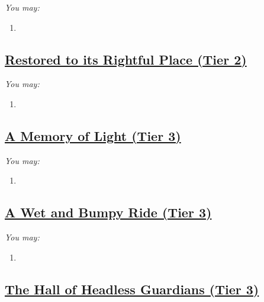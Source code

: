 \documentclass[sheet]{GL2020}
\begin{document}
\begingroup
\itshape
You may:
\begin{enumerate}[A]
  \item 
\end{enumerate}
\endgroup

\clearpage

\begin{center}\section*{\underline{Restored to its Rightful Place (Tier 2)}}\end{center}
\label{RestoredRightfulPlace}

\begingroup
\itshape
You may:
\begin{enumerate}[A]
  \item 
\end{enumerate}
\endgroup

\clearpage

\begin{center}\section*{\underline{A Memory of Light (Tier 3)}}\end{center}
\label{MemoryofLight}

\begingroup
\itshape
You may:
\begin{enumerate}[A]
  \item 
\end{enumerate}
\endgroup

\clearpage

\begin{center}\section*{\underline{A Wet and Bumpy Ride (Tier 3)}}\end{center}
\label{WetandBumpyRide}

\begingroup
\itshape
You may:
\begin{enumerate}[A]
  \item 
\end{enumerate}
\endgroup

\clearpage

\begin{center}\section*{\underline{The Hall of Headless Guardians (Tier 3)}}\end{center}
\label{HallofHeadlessGuardians}
\end{document}
